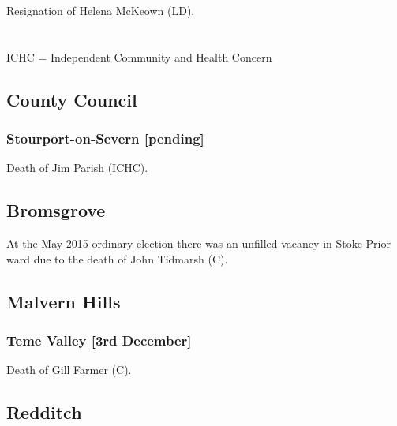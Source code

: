 \documentclass[a4paper,openany]{book}
\begin{document}
\begin{resultsiii}

Resignation of Helena McKeown (LD).

\section[Worcestershire]{}

ICHC = Independent Community and Health Concern

\subsection*{County Council}

\subsubsection*{Stourport-on-Severn \hspace*{\fill}\nolinebreak[1]%
\enspace\hspace*{\fill}
[pending]}


Death of Jim Parish (ICHC).

\subsection*{Bromsgrove}

At the May 2015 ordinary election there was an unfilled vacancy in Stoke Prior ward due to the death of John Tidmarsh (C).

\subsection*{Malvern Hills}

\subsubsection*{Teme Valley \hspace*{\fill}\nolinebreak[1]%
\enspace\hspace*{\fill}
[3rd December]}


Death of Gill Farmer (C).

\subsection*{Redditch}


\end{resultsiii}
\end{document}

